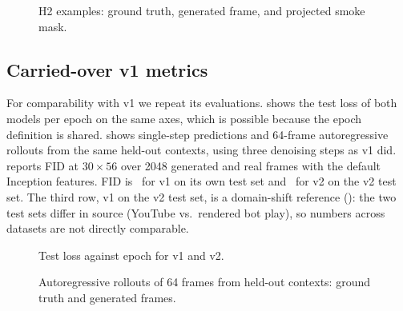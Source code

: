 \begin{table}[t]
  \centering\small
  \caption{H2. LPIPS (lower is better) and SSIM (higher is better) within smoke and static masks.}
  \label{tab:h2}
\end{table}

\begin{figure}[t]
  \centering
  \caption{H2 examples: ground truth, generated frame, and projected smoke mask.}
  \label{fig:h2}
\end{figure}

\subsection{Carried-over v1 metrics}
\label{sec:carried}
For comparability with v1 we repeat its evaluations.
 shows the test loss of both models per epoch on the same axes, which is possible because the epoch definition is shared.
 shows single-step predictions and 64-frame autoregressive rollouts from the same held-out contexts, using three denoising steps as v1 did.
 reports FID at $30{\times}56$ over 2048 generated and real frames with the default Inception features.
FID is \TBDfidVone\ for v1 on its own test set and \TBDfidVtwo\ for v2 on the v2 test set.
The third row, v1 on the v2 test set, is a domain-shift reference (\TBDfidShift): the two test sets differ in source (YouTube vs.\ rendered bot play), so numbers across datasets are not directly comparable.

\begin{table}[t]
  \centering\small
  \caption{FID at $30{\times}56$ (2048 frames).}
  \label{tab:carried}
\end{table}

\begin{figure}[t]
  \centering
  \caption{Test loss against epoch for v1 and v2.}
  \label{fig:loss}
\end{figure}

\begin{figure}[t]
  \centering
  \caption{Autoregressive rollouts of 64 frames from held-out contexts: ground truth and generated frames.}
  \label{fig:rollouts}
\end{figure}

